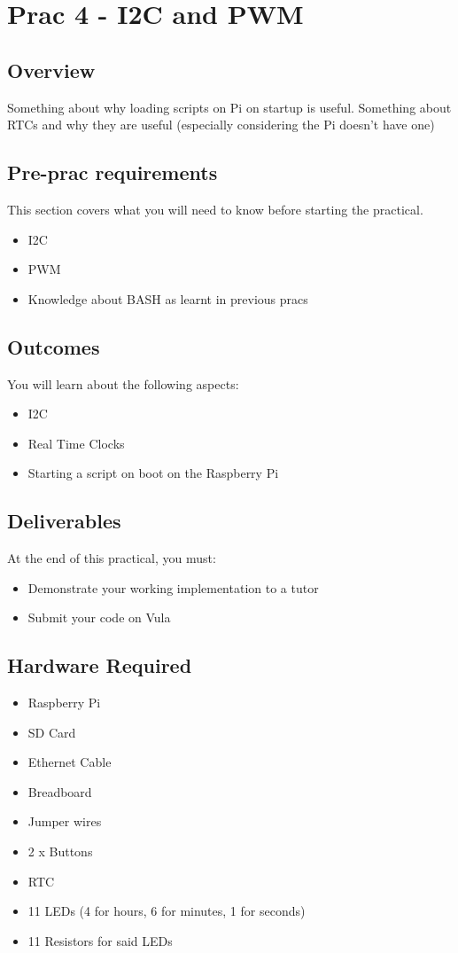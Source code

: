 \newpage
\section{Prac 4 - I2C and PWM}
\label{sec:Prac4}
\subsection{Overview}
Something about why loading scripts on Pi on startup is useful. Something about RTCs and why they are useful (especially considering the Pi doesn't have one)

\subsection{Pre-prac requirements}
This section covers what you will need to know before starting the practical.
\begin{itemize}
    \item I2C
    \item PWM
    \item Knowledge about BASH as learnt in previous pracs
\end{itemize}

\subsection{Outcomes}
You will learn about the following aspects:
\begin{itemize}
    \item I2C
    \item Real Time Clocks
    \item Starting a script on boot on the Raspberry Pi
\end{itemize}

\subsection{Deliverables}
At the end of this practical, you must:
\begin{itemize}
    \item Demonstrate your working implementation to a tutor
    \item Submit your code on Vula
\end{itemize}

\subsection{Hardware Required}
\begin{itemize}
    \item Raspberry Pi
    \item SD Card
    \item Ethernet Cable
    \item Breadboard
    \item Jumper wires
    \item 2 x Buttons
    \item RTC
    \item 11 LEDs (4 for hours, 6 for minutes, 1 for seconds)
    \item 11 Resistors for said LEDs
\end{itemize}


